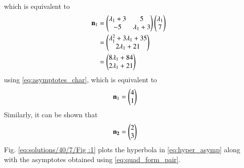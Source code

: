 \begin{enumerate}
\begin{multline}
\end{multline}
%
which is equivalent to
%
\begin{align}
\mathbf{n}_1 &= 
\begin{pmatrix} \lambda_1+3 & 5  \\ -5 & \lambda_1+3\end{pmatrix}\begin{pmatrix}\lambda_1 \\  7\end{pmatrix}
\\
&= \begin{pmatrix} \lambda^2_1+3\lambda_1 +35  \\ 2\lambda_1 +21\end{pmatrix}
\\
&= \begin{pmatrix} 8\lambda_1 +84  \\ 2\lambda_1 +21\end{pmatrix}
\end{align}
using \eqref{eq:asymptotes_char}, which is equivalent to
\begin{align}
\mathbf{n}_1 &= \begin{pmatrix}4 \\ 1\end{pmatrix}
\end{align}
%
Similarly, it can be shown that 
\begin{align}
\mathbf{n_2}&=\begin{pmatrix}2\\3\end{pmatrix} \label{eq:solutions/40/7/eq:normal1}
\end{align}
%
%
Fig.     \ref{eq:solutions/40/7/Fig :1} plots the hyperbola in \eqref{eq:hyper_asymp} along with the asymptotes obtained using \eqref{eq:quad_form_pair}.
 


\end{enumerate}
